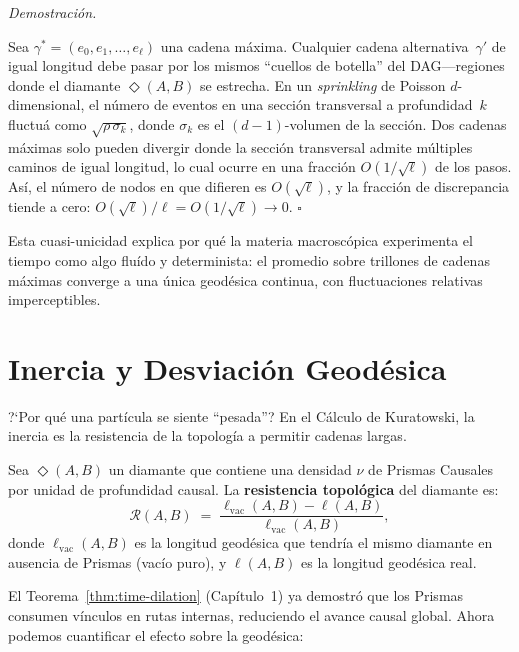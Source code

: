 \documentclass[11pt, a4paper, openany]{book}
\newcommand{\diam}[2]{\Diamond(#1,#2)}
\renewenvironment{proof}[1][Demostraci\'on]{%
  \par\noindent\textit{#1.}\quad
}{\hfill$\square$\par\medskip}
\begin{document}
\begin{proof}
Sea $\gamma^* = (e_0, e_1, \ldots, e_\ell)$ una cadena m\'axima.
Cualquier cadena alternativa~$\gamma'$ de igual longitud debe pasar
por los mismos ``cuellos de botella'' del DAG---regiones donde el
diamante $\diam{A}{B}$ se estrecha. En un \emph{sprinkling} de
Poisson $d$-dimensional, el n\'umero de eventos en una secci\'on
transversal a profundidad~$k$ fluctu\'a como $\sqrt{\rho\,\sigma_k}$,
donde $\sigma_k$ es el $(d{-}1)$-volumen de la secci\'on. Dos cadenas
m\'aximas solo pueden divergir donde la secci\'on transversal admite
m\'ultiples caminos de igual longitud, lo cual ocurre en una
fracci\'on $O(1/\sqrt{\ell})$ de los pasos. As\'i, el n\'umero de
nodos en que difieren es $O(\sqrt{\ell})$, y la fracci\'on de
discrepancia tiende a cero: $O(\sqrt{\ell})/\ell = O(1/\sqrt{\ell})
\to 0$.
\end{proof}

\noindent
Esta cuasi-unicidad explica por qu\'e la materia macrosc\'opica
experimenta el tiempo como algo flu\'ido y determinista: el promedio
sobre trillones de cadenas m\'aximas converge a una \'unica
geod\'esica continua, con fluctuaciones relativas imperceptibles.

\section{Inercia y Desviaci\'on Geod\'esica}

?`Por qu\'e una part\'icula se siente ``pesada''? En el C\'alculo de
Kuratowski, la inercia es la resistencia de la topolog\'ia a permitir
cadenas largas.

\begin{definition}
\label{def:topological-resistance}
Sea $\diam{A}{B}$ un diamante que contiene una densidad
$\nu$ de Prismas Causales por unidad de profundidad causal. La
\textbf{resistencia topol\'ogica} del diamante es:
\begin{equation}
  \mathcal{R}(A,B)
  \;=\;
  \frac{\ell_{\text{vac}}(A,B) - \ell(A,B)}{\ell_{\text{vac}}(A,B)},
  \label{eq:topological-resistance}
\end{equation}
donde $\ell_{\text{vac}}(A,B)$ es la longitud geod\'esica que
tendr\'ia el mismo diamante en ausencia de Prismas (vac\'io puro), y
$\ell(A,B)$ es la longitud geod\'esica real.
\end{definition}

\noindent
El Teorema~\ref{thm:time-dilation} (Cap\'itulo~1) ya demostr\'o que
los Prismas consumen v\'inculos en rutas internas, reduciendo el
avance causal global. Ahora podemos cuantificar el efecto sobre la
geod\'esica:
\end{document}
